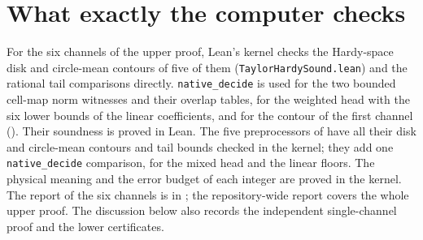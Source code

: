 \documentclass[11pt,a4paper]{article}
\newcommand{\lean}[1]{\texttt{\small #1}}
\begin{document}
\section{What exactly the computer checks}\label{sec:trust}
For the six channels of the upper proof, Lean's kernel checks the Hardy-space disk and circle-mean contours of five
of them (\lean{TaylorHardySound.lean}) and the rational tail comparisons directly. \lean{native\_decide} is used for the two bounded cell-map
norm witnesses and their overlap tables, for the weighted head with the six
lower bounds of the linear coefficients, and for the contour of the first channel
(). Their soundness is proved in Lean.
The five preprocessors of  have all their disk and circle-mean contours and tail bounds
checked in the kernel; they add one \lean{native\_decide} comparison, for the mixed head and the linear floors.
The physical meaning and the error budget of each integer are proved in the kernel.
The report of the six channels is in ; the repository-wide report covers the whole upper proof.
The discussion below also records the independent single-channel proof and the
lower certificates.
\end{document}
